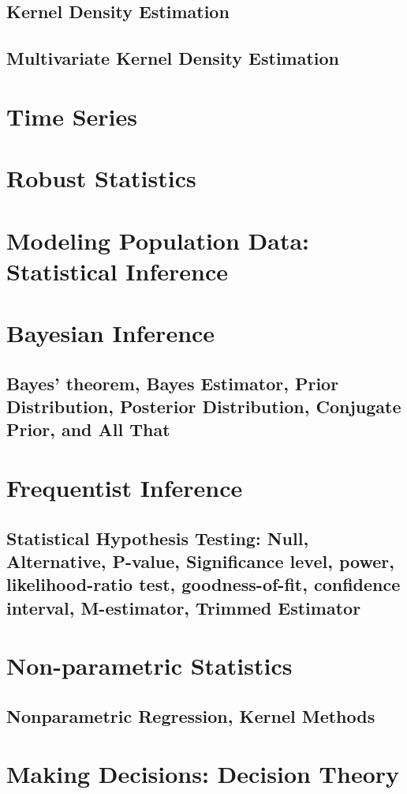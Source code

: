 \subsection{Kernel Density Estimation}
\subsection{Multivariate Kernel Density Estimation}
\section{Time Series}
\section{Robust Statistics}


\section{Modeling Population Data: Statistical Inference}
\section{Bayesian Inference}
\subsection{Bayes' theorem, Bayes Estimator, Prior Distribution, Posterior Distribution, Conjugate Prior, and All That}

\section{Frequentist Inference}
\subsection{Statistical Hypothesis Testing: Null, Alternative, P-value, Significance level, power, likelihood-ratio test, goodness-of-fit, confidence interval, M-estimator, Trimmed Estimator}

\section{Non-parametric Statistics}
\subsection{Nonparametric Regression, Kernel Methods}

\section{Making Decisions: Decision Theory}
